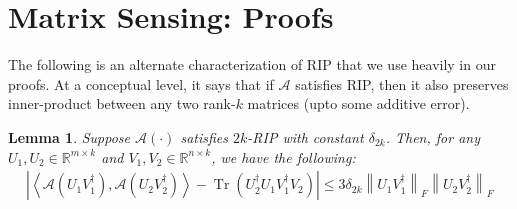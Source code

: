 \documentclass[11pt]{article}
\theoremstyle{plain}
\newtheorem{lemma}[theorem]{Lemma}
\theoremstyle{definition}
\newcommand{\Tr}{\operatorname{Tr}}
\newcommand{\R}{\mathbb{R}}
\newcommand{\calA}{\mathcal{A}}
\newcommand{\aff}{{\mathcal A}}
\begin{document}
\section{Matrix Sensing: Proofs}\label{app:sensing}
The following is an alternate characterization of RIP that we use heavily in our proofs.
At a conceptual level, it says that if $\aff$ satisfies RIP, then it also preserves inner-product between any two rank-$k$ matrices (upto some additive error).

\begin{lemma}\label{lem:alt_rip}
Suppose $\calA(\cdot)$ satisfies $2k$-RIP with constant $\delta_{2k}$. Then, for any $U_1,U_2\in \R^{m\times k}$ and
$V_1,V_2\in \R^{n\times k}$, we have the following:
\begin{align}\label{eqn:sensing-2k-RIP2}
  \left| \left\langle \calA\left(U_1V_1^\dag \right), \calA\left(U_2V_2^\dag \right)\right\rangle  - \Tr \left(U_2^\dag U_1V_1^\dag V_2\right) \right|
    \leq 3\delta_{2k} \left\|U_1V_1^\dag \right\|_F \left\|U_2V_2^\dag \right\|_F
\end{align}
\end{lemma}
\end{document}
